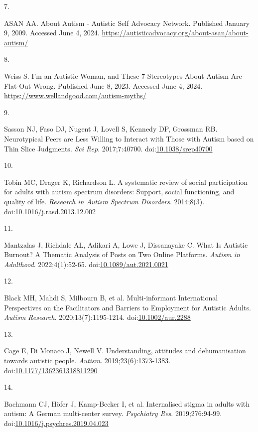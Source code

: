 \documentclass[
  letterpaper,
  DIV=11,
  numbers=noendperiod]{scrreprt}
\newlength{\cslhangindent}
\newlength{\csllabelwidth}
\newenvironment{CSLReferences}[2] %
 {\begin{list}{}{%
  \setlength{\itemindent}{0pt}
  \setlength{\leftmargin}{0pt}
  \setlength{\parsep}{0pt}
  \ifodd #1
   \setlength{\leftmargin}{\cslhangindent}
   \setlength{\itemindent}{-1\cslhangindent}
  \fi
  \setlength{\itemsep}{#2\baselineskip}}}
 {\end{list}}
\newcommand{\CSLLeftMargin}[1]{\parbox[t]{\csllabelwidth}{\strut#1\strut}}
\newcommand{\CSLRightInline}[1]{\parbox[t]{\linewidth - \csllabelwidth}{\strut#1\strut}}
\begin{document}
\begin{CSLReferences}{0}{1}
\CSLLeftMargin{7. }%
\CSLRightInline{ASAN AA. About {Autism} - {Autistic Self Advocacy
Network}. Published January 9, 2009. Accessed June 4, 2024.
\url{https://autisticadvocacy.org/about-asan/about-autism/}}

\CSLLeftMargin{8. }%
\CSLRightInline{Weiss S. I'm an {Autistic Woman}, and {These} 7
{Stereotypes About Autism Are Flat-Out Wrong}. Published June 8, 2023.
Accessed June 4, 2024. \url{https://www.wellandgood.com/autism-myths/}}

\CSLLeftMargin{9. }%
\CSLRightInline{Sasson NJ, Faso DJ, Nugent J, Lovell S, Kennedy DP,
Grossman RB. Neurotypical {Peers} are {Less Willing} to {Interact} with
{Those} with {Autism} based on {Thin Slice Judgments}. \emph{Sci Rep}.
2017;7:40700.
doi:\href{https://doi.org/10.1038/srep40700}{10.1038/srep40700}}

\CSLLeftMargin{10. }%
\CSLRightInline{Tobin MC, Drager K, Richardson L. A systematic review of
social participation for adults with autism spectrum disorders:
{Support}, social functioning, and quality of life. \emph{Research in
Autism Spectrum Disorders}. 2014;8(3).
doi:\href{https://doi.org/10.1016/j.rasd.2013.12.002}{10.1016/j.rasd.2013.12.002}}

\CSLLeftMargin{11. }%
\CSLRightInline{Mantzalas J, Richdale AL, Adikari A, Lowe J, Dissanayake
C. What {Is Autistic Burnout}? {A Thematic Analysis} of {Posts} on {Two
Online Platforms}. \emph{Autism in Adulthood}. 2022;4(1):52-65.
doi:\href{https://doi.org/10.1089/aut.2021.0021}{10.1089/aut.2021.0021}}

\CSLLeftMargin{12. }%
\CSLRightInline{Black MH, Mahdi S, Milbourn B, et al. Multi-informant
{International Perspectives} on the {Facilitators} and {Barriers} to
{Employment} for {Autistic Adults}. \emph{Autism Research}.
2020;13(7):1195-1214.
doi:\href{https://doi.org/10.1002/aur.2288}{10.1002/aur.2288}}

\CSLLeftMargin{13. }%
\CSLRightInline{Cage E, Di Monaco J, Newell V. Understanding, attitudes
and dehumanisation towards autistic people. \emph{Autism}.
2019;23(6):1373-1383.
doi:\href{https://doi.org/10.1177/1362361318811290}{10.1177/1362361318811290}}

\CSLLeftMargin{14. }%
\CSLRightInline{Bachmann CJ, Höfer J, Kamp-Becker I, et al. Internalised
stigma in adults with autism: {A German} multi-center survey.
\emph{Psychiatry Res}. 2019;276:94-99.
doi:\href{https://doi.org/10.1016/j.psychres.2019.04.023}{10.1016/j.psychres.2019.04.023}}


\end{CSLReferences}
\end{document}
